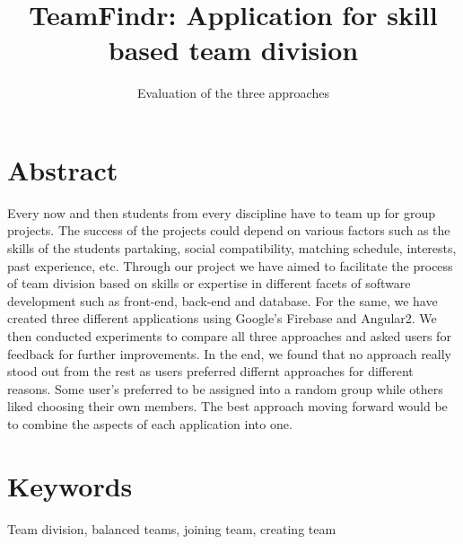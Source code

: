 \documentclass[conference]{IEEEtran}
\begin{document}
\title{TeamFindr: Application for skill based team division}
\subtitle{Evaluation of the three approaches}

\author{
}


\maketitle
\section{Abstract}
Every now and then students from every discipline have to team up for group projects. The success of the projects could depend on various factors such as the skills of the students partaking, social compatibility, matching schedule, interests, past experience, etc. Through our project we have aimed to facilitate the process of team division based on skills or expertise in different facets of software development such as front-end, back-end and database. For the same, we have created three different applications using Google's Firebase and Angular2. We then conducted experiments to compare all three approaches and asked users for feedback for further improvements. In the end, we found that no approach really stood out from the rest as users preferred differnt approaches for different reasons. Some user's preferred to be assigned into a random group while others liked choosing their own members. The best approach moving forward would be to combine the aspects of each application into one.       

\section{Keywords}
Team division, balanced teams, joining team, creating team
\end{document}
